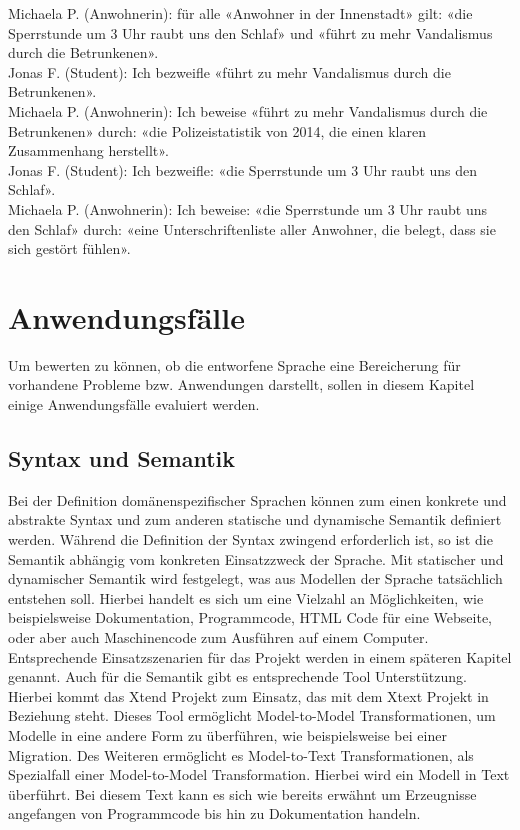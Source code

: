 \documentclass[11pt,a4paper,bibtotocnumbered]{scrreprt}
\begin{document}
Michaela P. (Anwohnerin): für alle «Anwohner in der Innenstadt» gilt: «die Sperrstunde um 3 Uhr raubt uns den Schlaf» und «führt zu mehr Vandalismus durch die Betrunkenen».\\
Jonas F. (Student): Ich bezweifle «führt zu mehr Vandalismus durch die Betrunkenen».\\
Michaela P. (Anwohnerin): Ich beweise «führt zu mehr Vandalismus durch die Betrunkenen» durch: «die Polizeistatistik von 2014, die einen klaren Zusammenhang herstellt». \\
Jonas F. (Student): Ich bezweifle: «die Sperrstunde um 3 Uhr raubt uns den Schlaf».\\
Michaela P. (Anwohnerin): Ich beweise: «die Sperrstunde um 3 Uhr raubt uns den Schlaf» durch: «eine Unterschriftenliste aller Anwohner, die belegt, dass sie sich gestört fühlen».

\chapter{Anwendungsfälle} %

Um bewerten zu können, ob die entworfene Sprache eine Bereicherung für vorhandene Probleme bzw. Anwendungen darstellt, sollen in diesem Kapitel einige Anwendungsfälle evaluiert werden.

\section{Syntax und Semantik} %
Bei der Definition domänenspezifischer Sprachen können zum einen konkrete und abstrakte Syntax und zum anderen statische und dynamische Semantik definiert werden.
Während die Definition der Syntax zwingend erforderlich ist, so ist die Semantik abhängig vom konkreten Einsatzzweck der Sprache. Mit statischer und dynamischer Semantik wird festgelegt, was aus Modellen der Sprache tatsächlich entstehen soll. Hierbei handelt es sich um eine Vielzahl an Möglichkeiten, wie beispielsweise Dokumentation, Programmcode, HTML Code für eine Webseite, oder aber auch Maschinencode zum Ausführen auf einem Computer. Entsprechende Einsatzszenarien für das Projekt werden in einem späteren Kapitel genannt.
Auch für die Semantik gibt es entsprechende Tool Unterstützung. Hierbei kommt das Xtend Projekt \cite{Xtend} zum Einsatz, das mit dem Xtext Projekt in Beziehung steht. Dieses Tool ermöglicht Model-to-Model Transformationen, um Modelle in eine andere Form zu überführen, wie beispielsweise bei einer Migration. Des Weiteren ermöglicht es Model-to-Text Transformationen, als Spezialfall einer Model-to-Model Transformation. Hierbei wird ein Modell in Text überführt. Bei diesem Text kann es sich wie bereits erwähnt um Erzeugnisse angefangen von Programmcode bis hin zu Dokumentation handeln.
\end{document}
